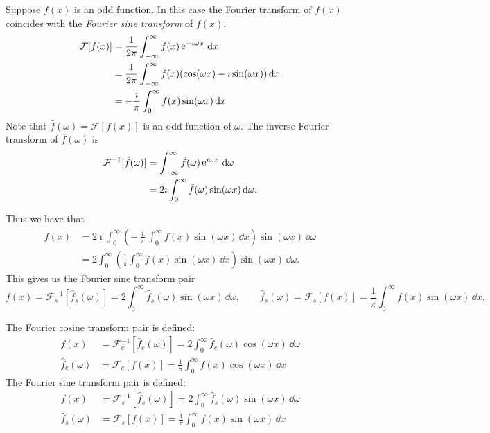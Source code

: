 Suppose $f(x)$ is an odd function.
In this case the Fourier transform of $f(x)$ coincides with the 
\textit{Fourier sine transform} of $f(x)$.
\begin{align*}
  \mathcal{F}[f(x)] 
  &= \frac{1}{2\pi} \int_{-\infty}^\infty f(x) \mathop{\mathrm{e}}\nolimits^{-\imath \omega x}\,\mathrm{d} x 
  \\
  &= \frac{1}{2\pi} \int_{-\infty}^\infty f(x) (\cos(\omega x) - \imath \sin(\omega x)) \,\mathrm{d} x 
  \\
  &= - \frac{\imath}{\pi} \int_0^\infty f(x) \sin(\omega x)\,\mathrm{d} x
\end{align*}
Note that $\hat{f}(\omega) = \mathcal{F}[f(x)]$ is an odd function of $\omega$.  
The inverse Fourier transform of $\hat{f}(\omega)$ is
\begin{align*}
  \mathcal{F}^{-1}[\hat{f}(\omega)]
  &= \int_{-\infty}^\infty \hat{f}(\omega) \mathop{\mathrm{e}}\nolimits^{\imath \omega x}\,\mathrm{d} \omega 
  \\
  &= 2 \imath \int_0^\infty \hat{f}(\omega) \sin(\omega x)\,\mathrm{d} \omega.
\end{align*}

Thus we have that 
\begin{align*}
  f(x)    
  &= 2 \imath \int_0^\infty \left( - \frac{\imath}{\pi} \int_0^\infty f(x) \sin(\omega x)
    \,\dd x \right) \sin(\omega x)\,\dd \omega 
  \\
  &= 2 \int_0^\infty \left( \frac{1}{\pi} \int_0^\infty f(x) \sin(\omega x)\,\dd x
  \right) \sin(\omega x) \,\dd \omega.
\end{align*}
This gives us the Fourier sine transform pair
\[ 
f(x) = \mathcal{F}_s^{-1}[\hat{f}_s(\omega)] = 2 \int_0^\infty \hat{f}_s(\omega) \sin(\omega x)\,\dd \omega, 
\qquad 
\hat{f}_s(\omega) = \mathcal{F}_s[f(x)] = \frac{1}{\pi} \int_0^\infty f(x)\sin(\omega x)\,\dd x.
\]







\begin{Result}
  The Fourier cosine transform pair is defined:
  \begin{align*}
    f(x) &= \mathcal{F}_c^{-1}[\hat{f}_c(\omega)] = 2 \int_0^\infty \hat{f}_c(\omega) \cos(\omega x)\,\dd \omega 
    \\
    \hat{f}_c(\omega) &= \mathcal{F}_c[f(x)] = \frac{1}{\pi} \int_0^\infty f(x) \cos(\omega x)\,\dd x
  \end{align*}
  The Fourier sine transform pair is defined:
  \begin{align*}
    f(x) &= \mathcal{F}_s^{-1}[\hat{f}_s(\omega)] = 2 \int_0^\infty \hat{f}_s(\omega) \sin(\omega x)\,\dd \omega 
    \\
    \hat{f}_s(\omega) &= \mathcal{F}_s[f(x)] = \frac{1}{\pi} \int_0^\infty f(x)\sin(\omega x)\,\dd x
  \end{align*}
\end{Result}










